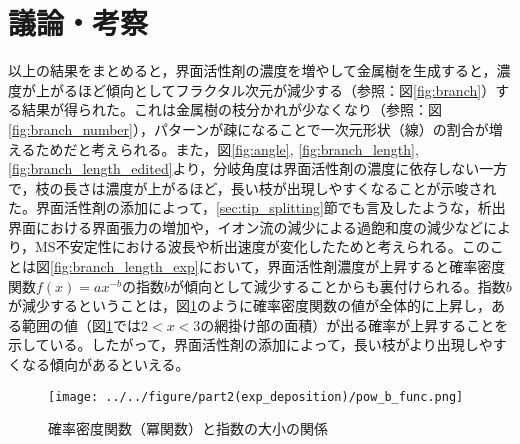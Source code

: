 \documentclass[autodetect-engine,dvi=dvipdfmx,a4paper,ja=standard,oneside,openany,11pt,draft]{bxjsbook}
\begin{document}
\section{議論・考察}
以上の結果をまとめると，界面活性剤の濃度を増やして金属樹を生成すると，濃度が上がるほど傾向としてフラクタル次元が減少する（参照：図\ref{fig:branch}）する結果が得られた。これは金属樹の枝分かれが少なくなり（参照：図\ref{fig:branch_number}），パターンが疎になることで一次元形状（線）の割合が増えるためだと考えられる。また，図\ref{fig:angle}, \ref{fig:branch_length}, \ref{fig:branch_length_edited}より，分岐角度は界面活性剤の濃度に依存しない一方で，枝の長さは濃度が上がるほど，長い枝が出現しやすくなることが示唆された。界面活性剤の添加によって，\ref{sec:tip_splitting}節でも言及したような，析出界面における界面張力の増加や，イオン流の減少による過飽和度の減少などにより，MS不安定性における波長や析出速度が変化したためと考えられる。このことは図\ref{fig:branch_length_exp}において，界面活性剤濃度が上昇すると確率密度関数$f(x)=ax^{-b}$の指数$b$が傾向として減少することからも裏付けられる。指数$b$が減少するということは，図\ref{fig:pow_b_func}のように確率密度関数の値が全体的に上昇し，ある範囲の値（図\ref{fig:pow_b_func}では$2<x<3$の網掛け部の面積）が出る確率が上昇することを示している。したがって，界面活性剤の添加によって，長い枝がより出現しやすくなる傾向があるといえる。

\begin{figure}[htbp]
  \centering
  \texttt{[image: ../../figure/part2(exp\_deposition)/pow\_b\_func.png]}
  \caption{確率密度関数（冪関数）と指数の大小の関係}
  \label{fig:pow_b_func}
\end{figure}

\ifdraft{
  
  
}{}
\end{document}
